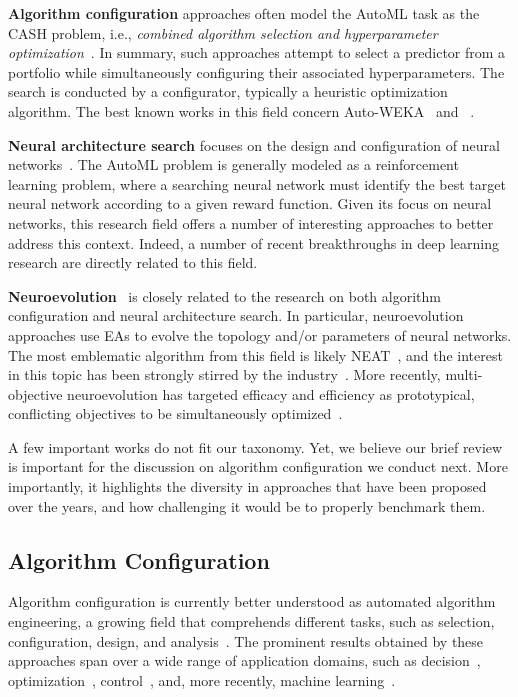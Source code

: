 \textbf{Algorithm configuration} approaches often model the AutoML task as the CASH problem, i.e., \emph{combined algorithm selection and hyperparameter optimization}~\cite{autoweka}. In summary, such approaches attempt to select a predictor from a portfolio while simultaneously configuring their associated hyperparameters. The search is conducted by a configurator, typically a heuristic optimization algorithm. The best known works in this field concern Auto-WEKA~\cite{autoweka} and \autosklearn~\cite{auto-sklearn}.

\textbf{Neural architecture search} focuses on the design and configuration of neural networks~\cite{ElsMetHut2019nas-survey}. The AutoML problem is generally modeled as a reinforcement learning problem, where a searching neural network must identify the best target neural network according to a given reward function. Given its focus on neural networks, this research field offers a number of interesting approaches to better address this context.
Indeed, a number of recent breakthroughs in deep learning research are directly related to this field.

\textbf{Neuroevolution}~\cite{StaMii2002neat,google-evonn,LuWhaBodDheDebGooBan2019nsganet} is closely related to the research on both algorithm configuration and neural architecture search. In particular, neuroevolution approaches use EAs to evolve the topology and/or parameters of neural networks. The most emblematic algorithm from this field is likely NEAT~\cite{StaMii2002neat}, and the interest in this topic has been strongly stirred by the industry~\cite{google-evonn}. More recently, multi-objective neuroevolution has targeted efficacy and efficiency as prototypical, conflicting objectives to be simultaneously optimized~\cite{LuWhaBodDheDebGooBan2019nsganet}.

A few important works do not fit our taxonomy. Yet, we believe our brief review is important for the discussion on algorithm configuration we conduct next. More importantly, it highlights the diversity in approaches that have been proposed over the years, and how challenging it would be to properly benchmark them.

\subsection{Algorithm Configuration}

Algorithm configuration is currently better understood as automated algorithm engineering, a growing field that comprehends different tasks, such as selection, configuration, design, and analysis~\cite{BezerraPhD}. The prominent results obtained by these approaches span over a wide range of application domains, such as decision~\cite{khudabukhsh2016satenstein}, optimization~\cite{BezerraPhD}, control~\cite{hasselmann2018automatic}, and, more recently, machine learning~\cite{autoweka,auto-sklearn}. 

